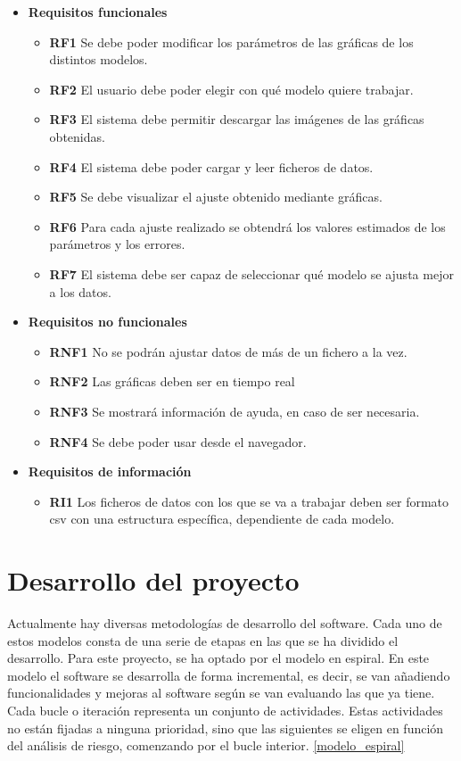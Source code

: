 \begin{itemize}
\item \textbf{Requisitos funcionales}
	\begin{itemize}
	\item \textbf{RF1} Se debe poder modificar los parámetros de las gráficas de los distintos modelos.
	\item \textbf{RF2} El usuario debe poder elegir con qué modelo quiere trabajar.
	\item \textbf{RF3} El sistema debe permitir descargar las imágenes de las gráficas obtenidas.
	\item \textbf{RF4} El sistema debe poder cargar y leer ficheros de datos.
	\item \textbf{RF5} Se debe visualizar el ajuste obtenido mediante gráficas.
	\item \textbf{RF6} Para cada ajuste realizado se obtendrá los valores estimados de los parámetros y los errores.
	\item \textbf{RF7} El sistema debe ser capaz de seleccionar qué modelo se ajusta mejor a los datos. 
	\end{itemize}
\item \textbf{Requisitos no funcionales}
	\begin{itemize}
	\item \textbf{RNF1} No se podrán ajustar datos de más de un fichero a la vez.
	\item \textbf{RNF2} Las gráficas deben ser en tiempo real
	\item \textbf{RNF3} Se mostrará información de ayuda, en caso de ser necesaria.
	\item \textbf{RNF4} Se debe poder usar desde el navegador.
	\end{itemize}
\item \textbf{Requisitos de información}
	\begin{itemize}
	\item \textbf{RI1} Los ficheros de datos con los que se va a trabajar deben ser formato csv con una estructura específica, dependiente de cada modelo.
	\end{itemize}
\end{itemize}

\section{Desarrollo del proyecto}

Actualmente hay diversas metodologías de desarrollo del software. Cada uno de estos modelos consta de una serie de etapas en las que se ha dividido el desarrollo. Para este proyecto, se ha optado por el modelo en espiral. En este modelo el software se desarrolla de forma incremental, es decir, se van añadiendo funcionalidades y mejoras al software según se van evaluando las que ya tiene. Cada bucle o iteración representa un conjunto de actividades. Estas actividades no están fijadas a ninguna prioridad, sino que las siguientes se eligen en función del análisis de riesgo, comenzando por el bucle interior. \eqref{modelo_espiral}

